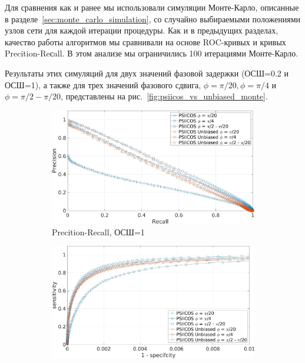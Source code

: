 Для сравнения как и ранее мы использовали симуляции Монте-Карло,
описанные в разделе~\ref{sec:monte_carlo_simulation}, со случайно выбираемыми положениями узлов сети
для каждой итерации процедуры. Как и в предыдущих разделах, качество работы алгоритмов мы сравнивали
на основе ROC-кривых и кривых Precition-Reсall. В этом анализе мы ограничились 100 итерациями Монте-Карло.

Результаты этих симуляций для двух значений фазовой задержки (ОСШ=0.2 и ОСШ=1),
а также для трех значений фазового сдвига, $\phi = \pi/20, \phi = \pi/4$ и $\phi=\pi/2 - \pi/20$,
представлены на рис.~\ref{fig:psiicos_vs_unbiased_monte}.

\begin{figure}[htbp]
    \begin{subfigure}[t]{0.5\textwidth}
        \includegraphics[width=1\textwidth]{../images/pre_rec_snr_1.jpg}
        \caption{Precition-Recall, ОСШ=1}\label{fig:psiicos_vs_unbiased_monte_a}
    \end{subfigure}
        \hspace{-1.5cm}
    \begin{subfigure}[t]{0.5\textwidth}
        \includegraphics[width=1\textwidth]{../images/roc_snr_1.jpg}

\end{subfigure}
\end{figure}
